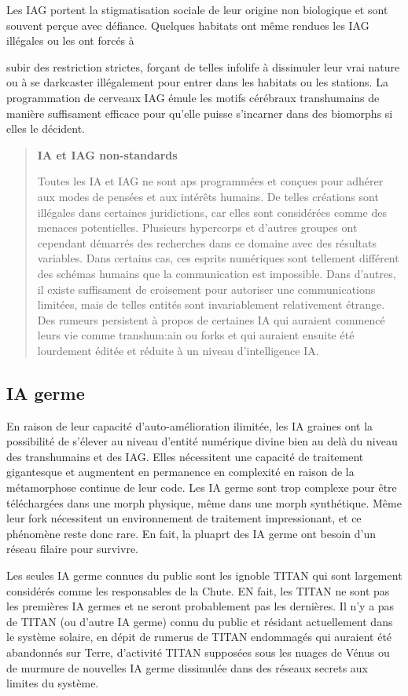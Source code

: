 Les IAG portent la stigmatisation sociale de leur origine non biologique et sont souvent perçue avec défiance. Quelques habitats ont même rendues les IAG illégales ou les ont forcés à 

subir des restriction strictes, forçant de telles infolife à dissimuler leur vrai nature ou à se darkcaster illégalement pour entrer dans les habitats ou les stations. La programmation de cerveaux IAG émule les motifs cérébraux transhumains de manière suffisament efficace pour qu'elle puisse s'incarner dans des biomorphs si elles le décident. 

\begin{quotation} \textbf{IA et IAG non-standards} 

Toutes les IA et IAG ne sont aps programmées et conçues pour adhérer aux modes de pensées et aux intérêts humains. De telles créations sont illégales dans certaines juridictions, car elles sont considérées comme des menaces potentielles. Plusieurs hypercorps et d'autres groupes ont cependant démarrés des recherches dans ce domaine avec des résultats variables. Dans certains cas, ces esprits numériques sont tellement différent des schémas humains que la communication est impossible. Dans d'autres, il existe suffisament de croisement pour autoriser une communications limitées, mais de telles entités sont invariablement relativement étrange. Des rumeurs persistent à propos de certaines IA qui auraient commencé leurs vie comme transhum:ain ou forks et qui auraient ensuite été lourdement éditée et réduite à un niveau d'intelligence IA. \end{quotation} 

\subsection{IA germe} 

En raison de leur capacité d'auto-amélioration ilimitée, les IA graines ont la possibilité de s'élever au niveau d'entité numérique divine bien au delà du niveau des transhumains et des IAG. Elles nécessitent une capacité de traitement gigantesque et augmentent en permanence en complexité en raison de la métamorphose continue de leur code. Les IA germe sont trop complexe pour être téléchargées dans une morph physique, même dans une morph synthétique. Même leur fork nécessitent un environnement de traitement impressionant, et ce phénomène reste donc rare. En fait, la pluaprt des IA germe ont besoin d'un réseau filaire pour survivre. 

Les seules IA germe connues du public sont les ignoble TITAN qui sont largement considérés comme les responsables de la Chute. EN fait, les TITAN ne sont pas les premières IA germes et ne seront probablement pas les dernières. Il n'y a pas de TITAN (ou d'autre IA germe) connu du public et résidant actuellement dans le système solaire, en dépit de rumerus de TITAN endommagés qui auraient été abandonnés sur Terre, d'activité TITAN supposées sous les nuages de Vénus ou de murmure de nouvelles IA germe dissimulée dans des réseaux secrets aux limites du système. 

